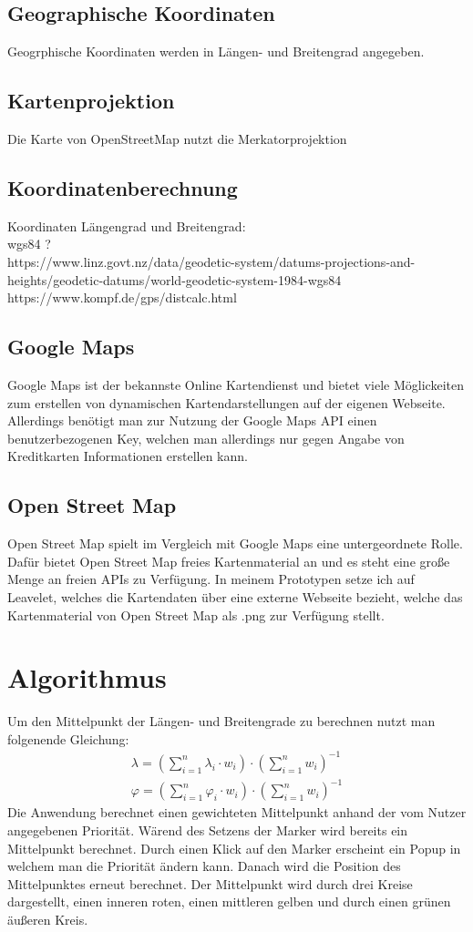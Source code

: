 \documentclass[a4paper, twoside, 12pt]{scrreprt}
\begin{document}
\section{Geographische Koordinaten}
Geogrphische Koordinaten werden in Längen- und Breitengrad angegeben.
\section{Kartenprojektion}
Die Karte von OpenStreetMap nutzt die Merkatorprojektion
\section{Koordinatenberechnung}
Koordinaten Längengrad und Breitengrad:\\ wgs84 ? \\
https://www.linz.govt.nz/data/geodetic-system/datums-projections-and-heights/geodetic-datums/world-geodetic-system-1984-wgs84 \\
https://www.kompf.de/gps/distcalc.html
\section{Google Maps}
Google Maps ist der bekannste Online Kartendienst und bietet viele Möglickeiten zum erstellen von dynamischen Kartendarstellungen auf der eigenen Webseite.
Allerdings benötigt man zur Nutzung der Google Maps API einen benutzerbezogenen Key, welchen man allerdings nur gegen Angabe von Kreditkarten Informationen erstellen kann.
\section{Open Street Map}
Open Street Map spielt im Vergleich mit Google Maps eine untergeordnete Rolle.
Dafür bietet Open Street Map freies Kartenmaterial an und es steht eine große Menge an freien APIs zu Verfügung.
In meinem Prototypen setze ich auf Leavelet, welches die Kartendaten über eine externe Webseite bezieht, welche das Kartenmaterial von Open Street Map als .png zur Verfügung stellt.

\chapter{Algorithmus}
Um den Mittelpunkt der Längen- und Breitengrade zu berechnen nutzt man folgenende Gleichung:
\begin{eqnarray}
\displaystyle
\lambda = \left(\sum_{i=1}^{n}\lambda_i \cdot w_i \right) \cdot \left(\sum_{i=1}^{n} w_i \right)^{-1}\\
\varphi = \left(\sum_{i=1}^{n}\varphi_i \cdot w_i \right) \cdot \left(\sum_{i=1}^{n} w_i \right)^{-1}
\end{eqnarray}
Die Anwendung berechnet einen gewichteten Mittelpunkt anhand der vom Nutzer angegebenen Priorität.
Wärend des Setzens der Marker wird bereits ein Mittelpunkt berechnet.
Durch einen Klick auf den Marker erscheint ein Popup in welchem man die Priorität ändern kann. 
Danach wird die Position des Mittelpunktes erneut berechnet.
Der Mittelpunkt wird durch drei Kreise dargestellt, einen inneren roten, einen mittleren gelben und durch einen grünen äußeren Kreis.
\end{document}
